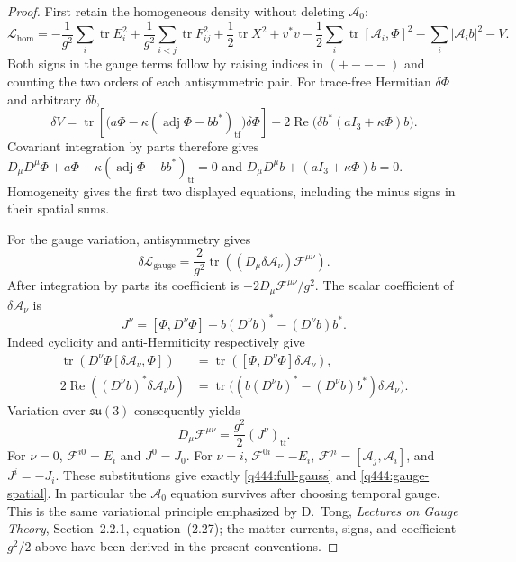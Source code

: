 \begin{proof}
First retain the homogeneous density without deleting $\mathcal A_0$:
\[
 \mathcal L_{\mathrm{hom}}
 =-\frac1{g^2}\sum_i\operatorname{tr}E_i^2
   +\frac1{g^2}\sum_{i<j}\operatorname{tr}F_{ij}^2
   +\frac12\operatorname{tr}X^2+v^*v
   -\frac12\sum_i\operatorname{tr}[\mathcal A_i,\Phi]^2
   -\sum_i|\mathcal A_i b|^2-V.
\]
Both signs in the gauge terms follow by raising indices in $(+---)$
and counting the two orders of each antisymmetric pair.
For trace-free Hermitian $\delta\Phi$ and arbitrary $\delta b$,
\[
 \delta V=
 \operatorname{tr}\!\left[
 \bigl(a\Phi-\kappa(\operatorname{adj}\Phi-bb^*)_{\mathrm{tf}}\bigr)
 \delta\Phi\right]
 +2\operatorname{Re}\bigl(\delta b^*(aI_3+\kappa\Phi)b\bigr).
\]
Covariant integration by parts therefore gives
$D_\mu D^\mu\Phi+a\Phi-
\kappa(\operatorname{adj}\Phi-bb^*)_{\mathrm{tf}}=0$ and
$D_\mu D^\mu b+(aI_3+\kappa\Phi)b=0$. Homogeneity gives the first
two displayed equations, including the minus signs in their spatial sums.

For the gauge variation, antisymmetry gives
\[
 \delta\mathcal L_{\mathrm{gauge}}
 =\frac2{g^2}\operatorname{tr}
       ((D_\mu\delta\mathcal A_\nu)\mathcal F^{\mu\nu}).
\]
After integration by parts its coefficient is
$-2D_\mu\mathcal F^{\mu\nu}/g^2$.
The scalar coefficient of $\delta\mathcal A_\nu$ is
\[
 J^\nu=[\Phi,D^\nu\Phi]
           +b(D^\nu b)^*-(D^\nu b)b^*.
\]
Indeed cyclicity and anti-Hermiticity respectively give
\begin{align*}
 \operatorname{tr}(D^\nu\Phi[\delta\mathcal A_\nu,\Phi])
 &=\operatorname{tr}([\Phi,D^\nu\Phi]\delta\mathcal A_\nu),\\
 2\operatorname{Re}((D^\nu b)^*\delta\mathcal A_\nu b)
 &=\operatorname{tr}\bigl((b(D^\nu b)^*-(D^\nu b)b^*)
                        \delta\mathcal A_\nu\bigr).
\end{align*}
Variation over $\mathfrak{su}(3)$ consequently yields
\[
 D_\mu\mathcal F^{\mu\nu}=\frac{g^2}{2}(J^\nu)_{\mathrm{tf}}.
\]
For $\nu=0$, $\mathcal F^{i0}=E_i$ and $J^0=J_0$.
For $\nu=i$, $\mathcal F^{0i}=-E_i$,
$\mathcal F^{ji}=[\mathcal A_j,\mathcal A_i]$, and $J^i=-J_i$.
These substitutions give exactly \eqref{q444:full-gauss} and
\eqref{q444:gauge-spatial}. In particular the $\mathcal A_0$ equation
survives after choosing temporal gauge. This is the same variational
principle emphasized by D.~Tong, \emph{Lectures on Gauge Theory},
Section~2.2.1, equation~(2.27); the matter currents, signs, and coefficient
$g^2/2$ above have been derived in the present conventions.
\end{proof}

